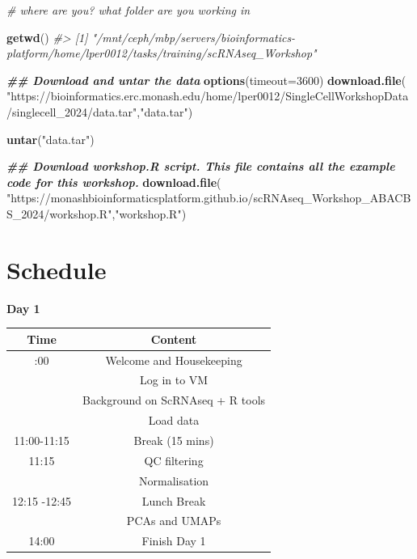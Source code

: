\documentclass[
]{book}
\newenvironment{Shaded}{\begin{snugshade}}{\end{snugshade}}
\newcommand{\AttributeTok}[1]{\textcolor[rgb]{0.13,0.29,0.53}{#1}}
\newcommand{\CommentTok}[1]{\textcolor[rgb]{0.56,0.35,0.01}{\textit{#1}}}
\newcommand{\DecValTok}[1]{\textcolor[rgb]{0.00,0.00,0.81}{#1}}
\newcommand{\DocumentationTok}[1]{\textcolor[rgb]{0.56,0.35,0.01}{\textbf{\textit{#1}}}}
\newcommand{\FunctionTok}[1]{\textcolor[rgb]{0.13,0.29,0.53}{\textbf{#1}}}
\newcommand{\NormalTok}[1]{#1}
\newcommand{\StringTok}[1]{\textcolor[rgb]{0.31,0.60,0.02}{#1}}
\begin{document}
\begin{Shaded}
\begin{Highlighting}[]
\CommentTok{\# where are you? what folder are you working in}

\FunctionTok{getwd}\NormalTok{()}
\CommentTok{\#\textgreater{} [1] "/mnt/ceph/mbp/servers/bioinformatics{-}platform/home/lper0012/tasks/training/scRNAseq\_Workshop"}

\DocumentationTok{\#\# Download and untar the data}
\FunctionTok{options}\NormalTok{(}\AttributeTok{timeout=}\DecValTok{3600}\NormalTok{)}
\FunctionTok{download.file}\NormalTok{(}
    \StringTok{"https://bioinformatics.erc.monash.edu/home/lper0012/SingleCellWorkshopData/singlecell\_2024/data.tar"}\NormalTok{,}\StringTok{"data.tar"}\NormalTok{)}

\FunctionTok{untar}\NormalTok{(}\StringTok{"data.tar"}\NormalTok{)}

\DocumentationTok{\#\# Download workshop.R script. This file contains all the example code for this workshop.}
\FunctionTok{download.file}\NormalTok{(}
    \StringTok{"https://monashbioinformaticsplatform.github.io/scRNAseq\_Workshop\_ABACBS\_2024/workshop.R"}\NormalTok{,}\StringTok{"workshop.R"}\NormalTok{)}
\end{Highlighting}
\end{Shaded}

\chapter{Schedule}\label{schedule}

\textbf{Day 1}

\begin{longtable}[]{@{}cc@{}}
\toprule\noalign{}
Time & Content \\
\midrule\noalign{}
\endhead
\bottomrule\noalign{}
\endlastfoot
10:00 & Welcome and Housekeeping \\
& Log in to VM \\
& Background on ScRNAseq + R tools \\
& Load data \\
11:00-11:15 & Break (15 mins) \\
11:15 & QC filtering \\
& Normalisation \\
12:15 -12:45 & Lunch Break \\
& PCAs and UMAPs \\
14:00 & Finish Day 1 \\
\end{longtable}
\end{document}
